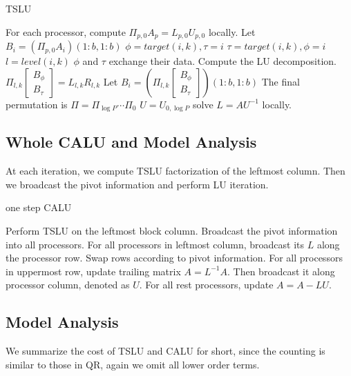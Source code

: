 \documentclass{article}
\begin{document}
\begin{algorithm}[htbp]
	\caption{TSLU}
	\label{alg:tslu}
	\begin{algorithmic}[1]
		\STATE For each processor, compute $\Pi_{p,0}A_p = L_{p,0}U_{p,0}$ locally. Let $B_i = (\Pi_{p,0}A_i)(1:b,1:b)$
		\STATE $\phi = target(i,k), \tau =  i$
		\ELSE
		\STATE  $\tau = target(i,k), \phi =  i$
		\ENDIF
		\STATE $l = level(i,k)$
		\STATE $\phi$ and $\tau$ exchange their data.
		\STATE Compute the LU decomposition. $\Pi_{l,k}\begin{bmatrix}
		B_{\phi} \\ B_{\tau}
		\end{bmatrix} = L_{l,k}R_{l,k}$
		\STATE Let $B_i = \left(\Pi_{l,k}\begin{bmatrix}
		B_{\phi} \\ B_{\tau}
		\end{bmatrix}\right)(1:b,1:b)$
		\ENDFOR
		\STATE The final permutation is $\Pi = \Pi_{\log P} \cdots \Pi_0$
		\STATE $U = U_{0,\log P}$
		\STATE solve $L = AU^{-1}$ locally.
	\end{algorithmic}
\end{algorithm}
\subsection{Whole CALU and Model Analysis}
At each iteration, we compute TSLU factorization of the leftmost column. Then we broadcast the pivot information and perform LU iteration. 

\begin{algorithm}[htbp]
	\caption{one step CALU}
	\label{alg:calu}
	\begin{algorithmic}[1]
		\STATE Perform TSLU on the leftmost block column.
		\STATE Broadcast the pivot information into all processors. For all processors in leftmost column, broadcast its $L$ along the processor row. 
		\STATE Swap rows according to pivot information.
		\STATE For all processors in uppermost row, update trailing matrix $A = L^{-1}A$. Then broadcast it along processor column, denoted as $U$.
		\STATE For all rest processors, update $A = A - LU$.
	\end{algorithmic}
\end{algorithm}

\subsection{Model Analysis}
We summarize the cost of TSLU and CALU for short, since the counting is similar to those in QR, again we omit all lower order terms.
\end{document}
